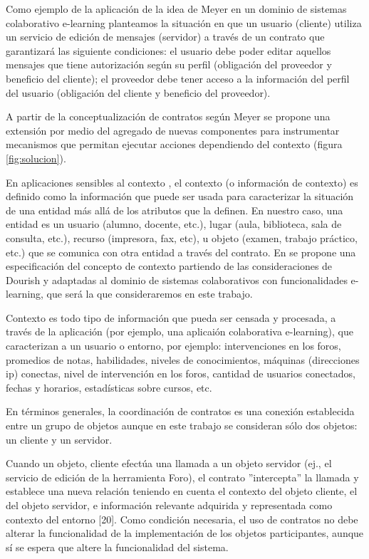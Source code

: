 {Como ejemplo de la aplicación de la idea de Meyer en un dominio de
sistemas colaborativo e-learning planteamos la situación en que un
usuario (cliente) utiliza un servicio de edición de mensajes (servidor) a través
de un contrato que garantizará las siguiente condiciones: el usuario debe poder
editar aquellos mensajes que tiene autorización según su perfil (obligación del
proveedor y beneficio del cliente); el proveedor debe tener acceso a la
información del perfil del usuario (obligación del cliente y beneficio del
proveedor).


A partir de la conceptualización de contratos según Meyer se propone una
extensión por medio del agregado de nuevas componentes para instrumentar
mecanismos que permitan ejecutar acciones dependiendo del contexto (figura
\ref{fig:solucion}).

En aplicaciones sensibles al contexto \cite{cap1.6}, el contexto (o información
de contexto) es definido como la información que puede ser usada
para caracterizar la situación de una entidad más allá de los atributos que la
definen. En nuestro caso, una entidad es un usuario (alumno, docente, etc.),
lugar (aula, biblioteca, sala de consulta, etc.), recurso (impresora, fax, etc),
u objeto (examen, trabajo práctico, etc.) que se comunica con otra entidad a
través del contrato. En \cite{cap1.2} se propone una especificación del concepto
de contexto partiendo de las consideraciones de Dourish \cite{cap1.20} y
adaptadas al dominio de sistemas colaborativos con funcionalidades e-learning,
que será la que consideraremos en este trabajo.

Contexto es todo tipo de información que pueda ser censada y procesada, a través
de la aplicación (por ejemplo, una aplicaión colaborativa e-learning), que
caracterizan a un usuario o entorno, por
ejemplo: intervenciones en los foros, promedios de notas, habilidades, niveles
de conocimientos, máquinas (direcciones ip) conectas, nivel de intervención en
los foros, cantidad de usuarios conectados, fechas y horarios, estadísticas
sobre cursos, etc.

En términos generales, la coordinación de contratos es una conexión
establecida entre un grupo de objetos aunque en este trabajo se consideran sólo
dos objetos: un cliente y un servidor.


Cuando un objeto, cliente efectúa una llamada a un objeto servidor (ej., el
servicio de edición de la herramienta Foro), el contrato ”intercepta” la
llamada y establece una nueva relación teniendo en cuenta el contexto del
objeto cliente, el del objeto servidor, e información relevante adquirida
y representada como contexto del entorno [20]. Como condición necesaria, el uso
de contratos no debe alterar la funcionalidad de la implementación de los
objetos participantes, aunque sí se espera que altere la funcionalidad del
sistema.


}
